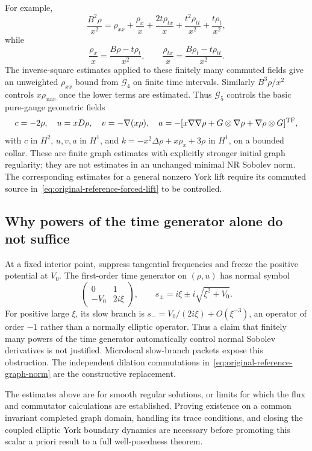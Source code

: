 For example,
\[
 \frac{B^2\rho}{x^2}=
 \rho_{xx}+\frac{\rho_x}{x}
 +\frac{2t\rho_{tx}}x
 +\frac{t^2\rho_{tt}}{x^2}+\frac{t\rho_t}{x^2},
\]
while
\[
 \frac{\rho_x}{x}=\frac{B\rho-t\rho_t}{x^2},\qquad
 \frac{\rho_{tx}}x=\frac{B\rho_t-t\rho_{tt}}{x^2}.
\]
The inverse-square estimates applied to these finitely many commuted fields
give an unweighted $\rho_{xx}$ bound from $\mathcal G_4$ on finite time
intervals.  Similarly $B^3\rho/x^2$ controls $x\rho_{xxx}$ once the lower
terms are estimated.  Thus $\mathcal G_5$ controls the basic pure-gauge
geometric fields
\[
 c=-2\rho,\quad u=xD\rho,\quad v=-\nabla(x\rho),\quad
 a=-[x\nabla\nabla\rho+G\otimes\nabla\rho+
 \nabla\rho\otimes G]^{\rm TF},
\]
with $c$ in $H^2$, $u,v,a$ in $H^1$, and
$k=-x^2\Delta\rho+x\rho_x+3\rho$ in $H^1$, on a bounded collar.
These are finite graph estimates with explicitly stronger initial graph
regularity; they are not estimates in an unchanged minimal NR Sobolev norm.
The corresponding estimates for a general nonzero York lift require its
commuted source in~\eqref{eq:original-reference-forced-lift} to be controlled.

\subsection{Why powers of the time generator alone do not suffice}

At a fixed interior point, suppress tangential frequencies and freeze the
positive potential at $V_0$.  The first-order time generator on $(\rho,u)$
has normal symbol
\[
 \begin{pmatrix}0&1\\-V_0&2i\xi\end{pmatrix},\qquad
 s_\pm=i\xi\pm i\sqrt{\xi^2+V_0}.
\]
For positive large $\xi$, its slow branch is
$s_-=V_0/(2i\xi)+O(\xi^{-3})$, an operator of order $-1$ rather than
a normally elliptic operator.  Thus a claim that finitely many powers of the
time generator automatically control normal Sobolev derivatives is not
justified.  Microlocal slow-branch packets expose this obstruction.  The
independent dilation commutations in~\eqref{eq:original-reference-graph-norm}
are the constructive replacement.

The estimates above are for smooth regular solutions, or limits for which
the flux and commutator calculations are established.  Proving existence on
a common invariant completed graph domain, handling its trace conditions,
and closing the coupled elliptic York boundary dynamics are necessary before
promoting this scalar a priori result to a full well-posedness theorem.
